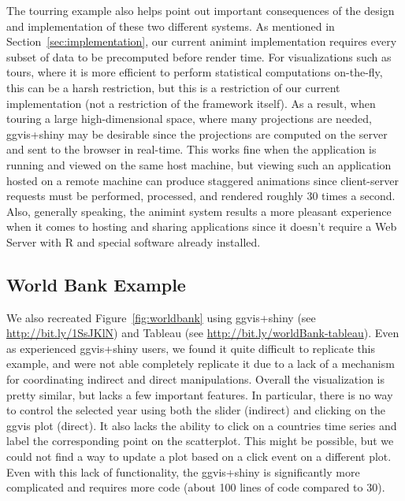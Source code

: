 \documentclass[12pt]{article}\usepackage[]{graphicx}\usepackage[]{color}
\begin{document}
The tourring example also helps point out important consequences of the
design and implementation of these two different systems. As mentioned in 
Section~\ref{sec:implementation}, our current animint implementation requires 
every subset of data to be precomputed before render time.
For visualizations such as tours, where it is more efficient to 
perform statistical computations on-the-fly, this can be a harsh restriction, 
but this is a restriction of our current implementation 
(not a restriction of the framework itself).
As a result, when touring a large high-dimensional space, where many 
projections are needed, ggvis+shiny may be desirable since the projections are 
computed on the server and sent to the browser in real-time. This works fine
when the application is running and viewed on the same host machine, but
viewing such an application hosted on a remote machine can produce
staggered animations since client-server requests must be performed, processed,
and rendered roughly 30 times a second. Also, generally speaking, 
the animint system results a more pleasant experience when it comes to hosting 
and sharing applications since it doesn't require a Web Server with R and 
special software already installed.

\subsection{World Bank Example}

We also recreated Figure~\ref{fig:worldbank} using ggvis+shiny (see 
\url{http://bit.ly/1SsJKlN}) and Tableau (see 
\url{http://bit.ly/worldBank-tableau}). 
Even as experienced ggvis+shiny users, we found it quite difficult to
replicate this example, and were not able completely replicate it 
due to a lack of a mechanism for coordinating indirect and direct
manipulations. Overall the visualization is pretty similar, but 
lacks a few important features. 
In particular, there is no way to control the selected
year using both the slider (indirect) and clicking on the ggvis plot (direct).
It also lacks the ability to click on a countries time series and label
the corresponding point on the scatterplot. This might be possible, but we
could not find a way to update a plot based on a click event on a different
plot. Even with this lack of functionality, the ggvis+shiny is significantly
more complicated and requires more code 
(about 100 lines of code compared to 30).

\end{document}
